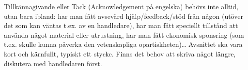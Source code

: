 Till\-känna\-gi\-van\-de eller Tack (Acknowledgement på engelska) behövs inte alltid, utan bara ibland: har man fått avsevärd hjälp/feedback/stöd från någon (utöver det som kan väntas t.ex. av en handledare), har man fått speciellt tillstånd att använda något material eller utrustning, har man fått ekonomisk sponsring (som t.ex. skulle kunna påverka den vetenskapliga opartiskheten)\ldots
Avsnittet ska vara kort och kärnfullt, typiskt ett stycke. Finns det behov att skriva något längre, diskutera med handledaren först.

